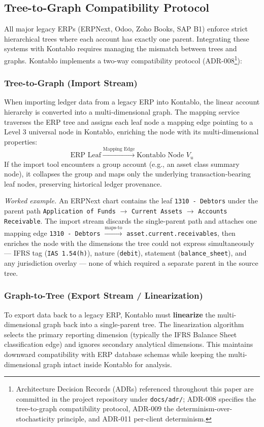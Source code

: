 \subsection{Tree-to-Graph Compatibility Protocol}
\label{subsec:tree_to_graph}
All major legacy ERPs (ERPNext, Odoo, Zoho Books, SAP B1) enforce strict hierarchical trees where each account has exactly one parent. Integrating these systems with Kontablo requires managing the mismatch between trees and graphs. Kontablo implements a two-way compatibility protocol (ADR-008\footnote{Architecture Decision Records (ADRs) referenced throughout this paper are committed in the project repository under \texttt{docs/adr/}; ADR-008 specifies the tree-to-graph compatibility protocol, ADR-009 the determinism-over-stochasticity principle, and ADR-011 per-client determinism.}):

\subsubsection{Tree-to-Graph (Import Stream)}
When importing ledger data from a legacy ERP into Kontablo, the linear account hierarchy is converted into a multi-dimensional graph. The mapping service traverses the ERP tree and assigns each leaf node a mapping edge pointing to a Level 3 universal node in Kontablo, enriching the node with its multi-dimensional properties:
\begin{equation}\label{eq:import_edge}
\text{ERP Leaf} \xrightarrow{\text{Mapping Edge}} \text{Kontablo Node } V_u
\end{equation}
If the import tool encounters a group account (e.g., an asset class summary node), it collapses the group and maps only the underlying transaction-bearing leaf nodes, preserving historical ledger provenance.

\emph{Worked example.} An ERPNext chart contains the leaf
\texttt{1310 - Debtors} under the parent path
\texttt{Application of Funds} $\rightarrow$ \texttt{Current Assets} $\rightarrow$
\texttt{Accounts Receivable}. The import stream discards the single-parent path
and attaches one mapping edge \texttt{1310 - Debtors}
$\xrightarrow{\text{maps-to}}$ \texttt{asset.current.receivables}, then enriches
the node with the dimensions the tree could not express simultaneously --- IFRS
tag (\texttt{IAS 1.54(h)}), nature (\texttt{debit}), statement
(\texttt{balance\_sheet}), and any jurisdiction overlay --- none of which
required a separate parent in the source tree.

\subsubsection{Graph-to-Tree (Export Stream / Linearization)}
To export data back to a legacy ERP, Kontablo must \textbf{linearize} the multi-dimensional graph back into a single-parent tree. The linearization algorithm selects the primary reporting dimension (typically the IFRS Balance Sheet classification edge) and ignores secondary analytical dimensions. This maintains downward compatibility with ERP database schemas while keeping the multi-dimensional graph intact inside Kontablo for analysis.

